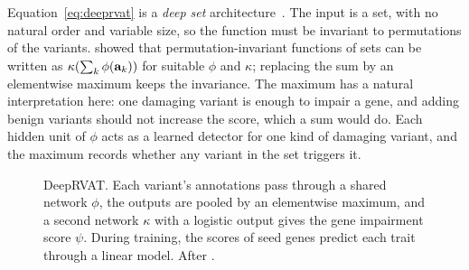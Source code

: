 Equation~\eqref{eq:deeprvat} is a \emph{deep set} architecture~\citep{zaheer2017}. The input is a set, with no natural order and variable size, so the function must be invariant to permutations of the variants. \citet{zaheer2017} showed that permutation-invariant functions of sets can be written as $\kappa(\sum_k\phi(\mathbf{a}_k))$ for suitable $\phi$ and $\kappa$; replacing the sum by an elementwise maximum keeps the invariance. The maximum has a natural interpretation here: one damaging variant is enough to impair a gene, and adding benign variants should not increase the score, which a sum would do. Each hidden unit of $\phi$ acts as a learned detector for one kind of damaging variant, and the maximum records whether any variant in the set triggers it.

\begin{figure}[!htbp]
  \centering
  \caption{DeepRVAT. Each variant's annotations pass through a shared network $\phi$, the outputs are pooled by an elementwise maximum, and a second network $\kappa$ with a logistic output gives the gene impairment score $\psi$. During training, the scores of seed genes predict each trait through a linear model. After \citet{clarke2024}.}
  \label{fig:deeprvat}
\end{figure}

